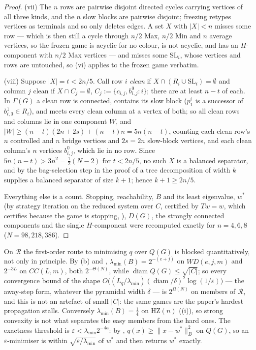 \begin{proof}
(vii) The $n$ rows are pairwise disjoint directed cycles carrying vertices of
all three kinds, and the $n$ slow blocks are pairwise disjoint; freezing
retypes vertices as terminals and so only deletes edges. A set $X$ with
$|X|<n$ misses some row --- which is then still a cycle through $n/2$ Max, $n/2$
Min and $n$ average vertices, so the frozen game is acyclic for no colour, is
not acyclic, and has an $H$-component with $n/2$ Max vertices --- and misses
some $\mathrm{SL}_i$, whose vertices and rows are untouched, so (vi) applies to
the frozen game verbatim.

(viii) Suppose $|X|=t<2n/5$. Call row $i$ \emph{clean} if
$X\cap(R_i\cup \mathrm{SL}_i)=\emptyset$ and column $j$ clean if
$X\cap C_j=\emptyset$, $C_j:=\{c_{i,j},b^{0}_{i,j}:i\}$; there are at least
$n-t$ of each. In $\Gamma(G)$ a clean row is connected, contains its slow
block ($p^{i}_1$ is a successor of $b^{1}_{i,0}\in R_i$), and meets every clean
column at a vertex of both; so all clean rows and columns lie in one component
$W$, and
$|W|\ge(n-t)(2n+2s)+(n-t)n=5n(n-t)$, counting each clean row's $n$ controlled
and $n$ bridge vertices and $2s=2n$ slow-block vertices, and each clean
column's $n$ vertices $b^{0}_{i,j}$, which lie in no row. Since
$5n(n-t)>3n^{2}=\tfrac12(N-2)$ for $t<2n/5$, no such $X$ is a balanced
separator, and by the bag-selection step in the proof of  a tree
decomposition of width $k$ supplies a balanced separator of size $k+1$; hence
$k+1\ge2n/5$.

Everything else is a count. Stopping, reachability, $B$ and its least
eigenvalue, $w^\ast$ (by strategy iteration on the reduced system over $C$,
certified by $Tw=w$, which certifies because the game is stopping,
), $D(G)$, the strongly connected components and the
single $H$-component were recomputed exactly for $n=4,6,8$
($N=98,218,386$).
\end{proof}

\begin{remark}\label{hz:cond}
On $\mathcal R$ the first-order route to minimising $q$ over $Q(G)$ is blocked
quantitatively, not only in principle. By (b) and
, $\lambda_{\min}(B)=2^{-(e+j)}$ on $WD(e,j,m)$ and $2^{-3L}$
on $CC(L,m)$, both $2^{-\Theta(N)}$, while $\operatorname{diam}Q(G)\le\sqrt{|C|}$;
so every convergence bound of the shape
$O\bigl((L_q/\lambda_{\min})(\operatorname{diam}/\delta)^{2}\log(1/\varepsilon)\bigr)$
--- the away-step form, whatever the pyramidal width $\delta$ --- is
$2^{\Omega(N)}$ on members of $\mathcal R$, and this is not an artefact of
small $|C|$: the same games are the paper's hardest propagation stalls.
Conversely $\lambda_{\min}(B)=\tfrac14$ on $\mathrm{HZ}(n)$
((i)), so strong convexity is not what separates the easy
members from the hard ones. The exactness threshold is
$\varepsilon<\lambda_{\min}2^{-4a}$: by ,
$q(x)\ge\|x-w^\ast\|_B^{2}$ on $Q(G)$, so an $\varepsilon$-minimiser is within
$\sqrt{\varepsilon/\lambda_{\min}}$ of $w^\ast$ and
 then returns $w^\ast$ exactly.
\end{remark}

